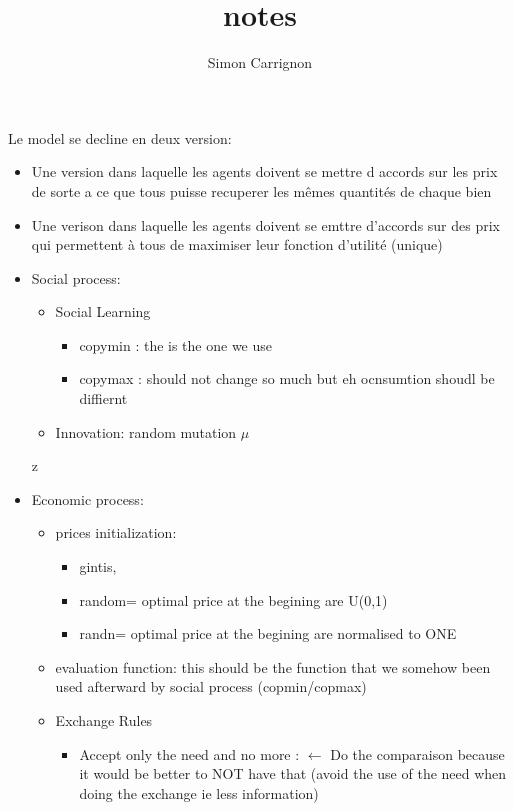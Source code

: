 \documentclass[a4paper]{article}
\title{notes}
\author{Simon Carrignon}
\begin{document}
Le model se decline en deux version:

\begin{itemize}
    \item Une version dans laquelle les agents doivent se mettre d accords sur les prix de sorte a ce que tous puisse recuperer les mêmes quantités de chaque bien
    \item Une verison dans laquelle  les agents doivent se emttre d'accords sur des prix qui permettent à tous de maximiser leur fonction d'utilité (unique)
\end{itemize}


	\begin{itemize}
	    \item  Social process: 
		\begin{itemize}
		    \item Social Learning
			\begin{itemize}
			    \item copymin : the is the one we use
			    \item copymax : should not change so much but eh ocnsumtion shoudl be diffiernt
			\end{itemize}
		    \item Innovation: random mutation $\mu$
		\end{itemize}
		
	z    \item  Economic process:
		\begin{itemize}
		    \item prices initialization:
			\begin{itemize}
			    \item gintis,
			    \item random= optimal price at the begining are U(0,1) 
			    \item randn= optimal price at the begining are normalised to ONE
			\end{itemize}
		    \item evaluation function: this should be the function that we somehow been used afterward by social process (copmin/copmax)
		    \item Exchange Rules 
			\begin{itemize}
			    \item Accept only the need and no more : $\leftarrow$ Do the comparaison because it would be better to NOT have that (avoid the use of the need when doing the exchange ie less information)
			\end{itemize}
		\end{itemize}
	\end{itemize}
\end{document}
